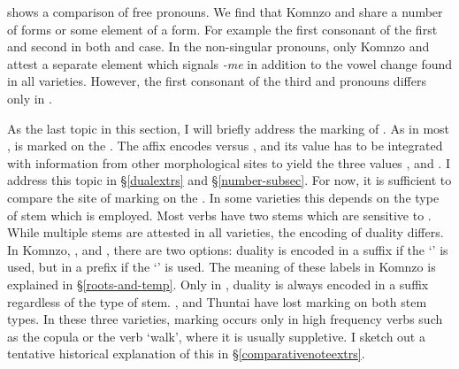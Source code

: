  shows a comparison of free pronouns. We find that Komnzo and  share a number of forms or some element of a form. For example the first consonant of the first and second  in both  and  case. In the  non-singular pronouns, only Komnzo and  attest a separate element which signals  \emph{-me} in addition to the vowel change found in all varieties. However, the first consonant of the third   and  pronouns differs only in .

As the last topic in this section, I will briefly address the marking of  . As in most ,   is marked on the . The affix encodes  versus  , and its value has to be integrated with information from other morphological sites to yield the three  values ,  and . I address this topic in \S\ref{dualextrs} and \S\ref{number-subsec}. For now, it is sufficient to compare the site of  marking on the . In some varieties this depends on the type of  stem which is employed. Most verbs have two stems which are sensitive to . While multiple  stems are attested in all  varieties, the encoding of duality differs. In Komnzo, ,  and , there are two options: duality is encoded in a suffix if the `' is used, but in a prefix if the `' is used. The meaning of these labels in Komnzo is explained in \S\ref{roots-and-temp}. Only in , duality is always encoded in a suffix regardless of the type of stem. ,  and  Thuntai have lost  marking on both stem types. In these three varieties,  marking occurs only in high frequency verbs such as the copula or the verb `walk', where it is usually suppletive. I sketch out a tentative historical explanation of this in \S\ref{comparativenoteextrs}.

